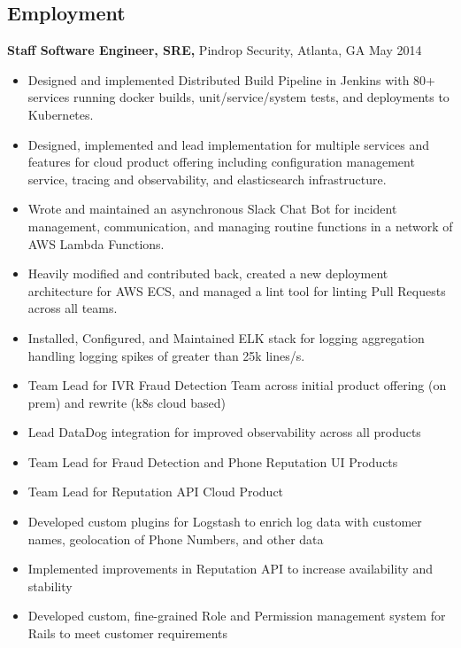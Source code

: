 \documentclass[margin]{res}
\begin{document}
\begin{resume}
\section{Employment}

    {\bf Staff Software Engineer, SRE,} Pindrop Security, Atlanta, GA \hfill May 2014
        \begin{itemize} \itemsep -2pt %
            \item Designed and implemented Distributed Build Pipeline in Jenkins with 80+ services running
                docker builds, unit/service/system tests, and deployments to Kubernetes.
            \item Designed, implemented and lead implementation for multiple services and features for cloud
                product offering including configuration management service, tracing and observability, and
                elasticsearch infrastructure.
            \item Wrote and maintained an asynchronous Slack Chat Bot for incident management, communication,
                and managing routine functions in a network of AWS Lambda Functions.
            \item Heavily modified and contributed back, created a new deployment architecture for AWS ECS,
                and managed a lint tool for linting Pull Requests across all teams.
            \item Installed, Configured, and Maintained ELK stack for logging aggregation handling logging
                spikes of greater than 25k lines/s.
            \item Team Lead for IVR Fraud Detection Team across initial product offering (on prem) and rewrite
                (k8s cloud based)
            \item Lead DataDog integration for improved observability across all products
            \item Team Lead for Fraud Detection and Phone Reputation UI Products
            \item Team Lead for Reputation API Cloud Product
            \item Developed custom plugins for Logstash to enrich log data with customer names, geolocation of
                Phone Numbers, and other data
            \item Implemented improvements in Reputation API to increase availability and stability
            \item Developed custom, fine-grained Role and Permission management system for Rails to meet
                customer requirements
        \end{itemize}


\end{resume}
\end{document}
